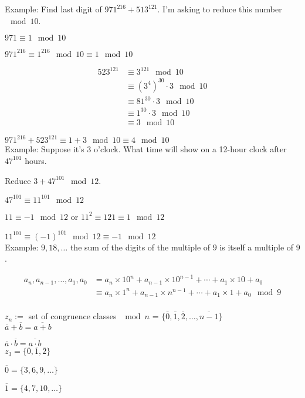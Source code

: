 \documentclass[a4paper, 11pt, twoside]{article}
\begin{document}
Example: Find last digit of $971^{216} + 513^{121}$. I'm asking to reduce this number $\mod 10$.

$971\equiv 1\mod 10$

$971^{216}\equiv 1^{216}\mod 10\equiv 1\mod 10$

\[
\begin{split}
	523^{121}&\equiv 3^{121}\mod 10\\
	&\equiv (3^{4})^{30}\cdot 3 \mod 10\\
	&\equiv 81^{30}\cdot 3\mod 10\\
	&\equiv 1^{30}\cdot 3\mod 10\\
	&\equiv 3\mod 10
\end{split}
\]

$971^{216}+523^{121}\equiv 1+3\mod 10\equiv 4\mod 10$\\

Example: Suppose it's 3 o'clock. What time will show on a 12-hour clock after $47^{101}$ hours.

Reduce $3+47^{101}\mod 12$.

$47^{101}\equiv 11^{101} \mod 12$

$11\equiv -1 \mod 12$ or $11^2\equiv 121\equiv 1 \mod 12$

$11^{101} \equiv (-1)^{101} \mod 12 \equiv -1 \mod 12$\\

Example: $9,18,\dots$ the sum of the digits of the multiple of $9$ is itself a multiple of $9$.

\[
\begin{split}
	a_n, a_{n-1}, \dots, a_1, a_0 &= a_n\times 10^n + a_{n-1}\times 10^{n-1} + \cdots + a_1\times 10 + a_0 \\
	&\equiv a_n\times 1^n + a_{n-1}\times n^{n-1} +\cdots + a_1\times 1 + a_0 \mod 9
\end{split}
\]\\

$z_n:=$ set of congruence classes $\mod n$ = $\{\bar{0}, \bar{1}, \bar{2}, \dots, \overline{n-1}\}$\\

$\overline{a}+\overline{b}=\overline{a+b}$

$\overline{a}\cdot\overline{b}=\overline{a\cdot b}$\\

$z_3 = \{\overline{0}, \overline{1}, \overline{2}\}$

$\overline{0}=\{3,6,9,\dots\}$

$\overline{1}=\{4,7,10,\dots\}$
\end{document}
